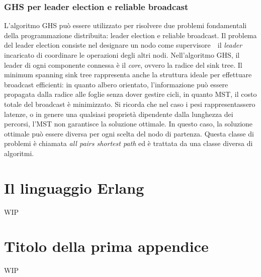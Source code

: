 \documentclass[target=bach,aauheader=,style=]{thud}
\newcommand{\eng}[1]{\foreignlanguage{english}{#1}}
\begin{document}
\subsection{GHS per leader \eng{election} e \eng{reliable broadcast}}
L'algoritmo GHS può essere utilizzato per risolvere due problemi fondamentali della programmazione distribuita: leader \eng{election} e \eng{reliable broadcast}. Il problema del leader \eng{election} consiste nel designare un nodo come supervisore \,\textendash\, il \emph{leader} \,\textendash\, incaricato di coordinare le operazioni degli altri nodi. Nell'algoritmo GHS, il leader di ogni componente connessa è il \emph{core}, ovvero la radice del \eng{sink tree}. Il \eng{minimum spanning sink tree} rappresenta anche la struttura ideale per effettuare \eng{broadcast} efficienti: in quanto albero orientato, l'informazione può essere propagata dalla radice alle foglie senza dover gestire cicli, in quanto MST, il costo totale del \eng{broadcast} è minimizzato. Si ricorda che nel caso i pesi rappresentassero latenze, o in genere una qualsiasi proprietà dipendente dalla lunghezza dei percorsi, l'MST non garantisce la soluzione ottimale. In questo caso, la soluzione ottimale può essere diversa per ogni scelta del nodo di partenza. Questa classe di problemi è chiamata \eng{\emph{all pairs shortest path}} ed è trattata da una classe diversa di algoritmi.


\chapter{Il linguaggio Erlang}

WIP

\appendix


\chapter{Titolo della prima appendice}
WIP

\backmatter
\end{document}

